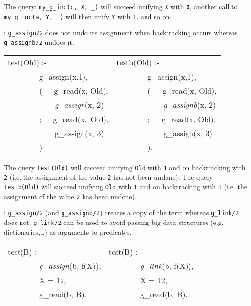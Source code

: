 The query: \texttt{my\_g\_inc(c, X, \_)} will succeed unifying \texttt{X} with
\texttt{0}, another call to \texttt{my\_g\_inc(a, Y, \_)} will then unify
\texttt{Y} with \texttt{1}, and so on.

:
\texttt{g\_assign/2} does not undo its assignment when backtracking occurs
whereas \texttt{g\_assignb/2} undoes it.

\begin{Code}
\begin{tabular}{@{}p{6cm}@{\quad}l@{}}
test(Old) :-                 & testb(Old) :- \\
~~~~~~~~g\_assign(x,1),      & ~~~~~~~~g\_assign(x,1), \\
~~~~~~~~(~~~g\_read(x, Old), & ~~~~~~~~(~~~g\_read(x, Old), \\
~~~~~~~~~~~~\textit{g\_assign}(x, 2)  & ~~~~~~~~~~~~\textit{g\_assignb}(x, 2) \\
~~~~~~~~;~~~g\_read(x,~Old), & ~~~~~~~~;~~~g\_read(x, Old), \\
~~~~~~~~~~~~g\_assign(x, 3)  & ~~~~~~~~~~~~g\_assign(x, 3) \\
~~~~~~~~).                   & ~~~~~~~~).                  \\
\end{tabular}
\end{Code}

The query \texttt{test(Old)} will succeed unifying \texttt{Old} with
\texttt{1} and on backtracking with \texttt{2} (i.e. the assignment of the
value \texttt{2} has not been undone). The query \texttt{testb(Old)} will
succeed unifying \texttt{Old} with \texttt{1} and on backtracking with
\texttt{1} (i.e. the assignment of the value \texttt{2} has been undone).

:
\texttt{g\_assign/2} (and \texttt{g\_assignb/2}) creates a copy of the term
whereas \texttt{g\_link/2} does not. \texttt{g\_link/2} can be used to avoid
passing big data structures (e.g. dictionaries,\ldots) as arguments to
predicates.

\begin{Code}
\begin{tabular}{@{}p{6cm}@{\quad}l@{}}
test(B) :-                           & test(B) :-                \\
~~~~~~~~\textit{g\_assign}(b, f(X)), & ~~~~~~~~\textit{g\_link}(b, f(X)), \\
~~~~~~~~X = 12,                      & ~~~~~~~~X = 12,           \\
~~~~~~~~g\_read(b, B).               & ~~~~~~~~g\_read(b, B).    \\
\end{tabular}
\end{Code}

